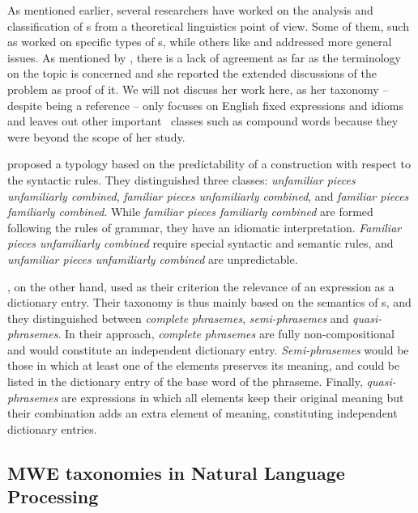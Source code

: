\documentclass[output=paper]{langsci/langscibook}
\begin{document}
As mentioned earlier, several researchers have worked on the analysis and classification of \mwe s from a theoretical linguistics point of view.
Some of them, such as \citet{moon1998} worked on specific types of \mwe s, while others like \citet{Melcuk:1995} and \citet{FillmoreEtAl1988} addressed more general issues.
As mentioned by \citet{moon1998}, there is a lack of agreement as far as the terminology on the topic is concerned and she reported the extended discussions of the problem as proof of it.
We will not discuss her work here, as her taxonomy -- despite being a reference -- only focuses on English fixed expressions and idioms and leaves out other important \mwe\ classes such as compound words because they were beyond the scope of her study.

\citet{FillmoreEtAl1988} proposed a typology based on the predictability of a construction with respect to the syntactic rules. 
They distinguished three classes: 
\textit{unfamiliar pieces unfamiliarly combined}, 
\textit{familiar pieces unfamiliarly combined}, and
\textit{familiar pieces familiarly combined}. 
While \textit{familiar pieces familiarly combined} are formed following the rules of grammar, they have an idiomatic interpretation. 
\textit{Familiar pieces unfamiliarly combined} require special syntactic and semantic rules, and \textit{unfamiliar pieces unfamiliarly combined} are unpredictable.

\citet{Melcuk:1995}, on the other hand, used as their criterion the relevance of an expression as a dictionary entry. 
Their taxonomy is thus mainly based on the semantics of \mwe s, and they distinguished between \textit{complete} \linebreak\textit{phrasemes}, \textit{semi-phrasemes} and \textit{quasi-phrasemes}. 
In their approach, \textit{complete phrasemes} are fully non-compositional and would constitute an independent dictionary entry. 
\textit{Semi-phrasemes} would be those in which at least one of the elements preserves its meaning, and could be listed in the dictionary entry of the base word of the phraseme. 
Finally, \textit{quasi-phrasemes} are expressions in which all elements keep their original meaning but their combination adds an extra element of meaning, constituting independent dictionary entries. 

\subsection{MWE taxonomies in Natural Language Processing}
\label{ssec:taxonomies_nlp}
\end{document}
